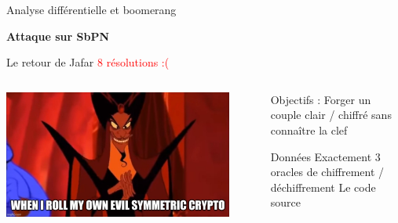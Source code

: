 \begin{frame}{Analyse différentielle et boomerang}
    \large{\centerline{\textbf{Attaque sur SbPN}}}

\end{frame}


\begin{frame}{Le retour de Jafar \FiveStar \FiveStar \hfill \textcolor{red}{8 résolutions :(}}
    \begin{columns}[c]
        \begin{center}                  
            \includegraphics[width=0.9\textwidth]{img/meme/jafar-intro.png}
        \end{center}

           \begin{outline}
                \1 Objectifs : 
                    \2 Forger un couple clair / chiffré sans connaître la clef

                    \pause 
                \1 Données
                    \2 Exactement 3 oracles de chiffrement / déchiffrement
                    \2 Le code source
           \end{outline}
    \end{columns}
\end{frame}



